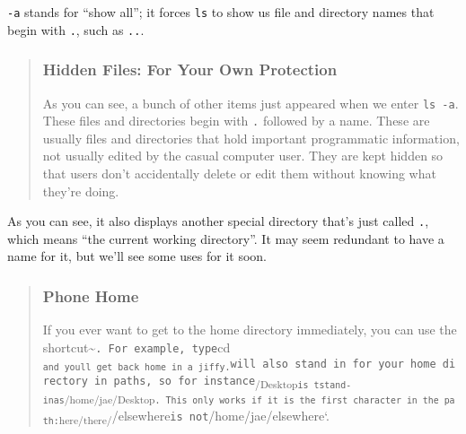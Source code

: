 \documentclass[
]{book}
\newenvironment{Shaded}{\begin{snugshade}}{\end{snugshade}}
\newcommand{\AttributeTok}[1]{\textcolor[rgb]{0.77,0.63,0.00}{#1}}
\newcommand{\BuiltInTok}[1]{#1}
\newcommand{\ExtensionTok}[1]{#1}
\newcommand{\NormalTok}[1]{#1}
\begin{document}
\begin{Shaded}
\end{Shaded}

\texttt{-a} stands for ``show all''; it forces \texttt{ls} to show us file and directory names that begin with \texttt{.}, such as \texttt{..}.

\begin{quote}
\hypertarget{hidden-files-for-your-own-protection}{%
\subsubsection{Hidden Files: For Your Own Protection}\label{hidden-files-for-your-own-protection}}

As you can see, a bunch of other items just appeared when we enter \texttt{ls\ -a}. These files and directories begin with \texttt{.} followed by a name. These are usually files and directories that hold important programmatic information, not usually edited by the casual computer user. They are kept hidden so that users don't accidentally delete or edit them without knowing what they're doing.
\end{quote}

As you can see, it also displays another special directory that's just called \texttt{.}, which means ``the current working directory''. It may seem redundant to have a name for it, but we'll see some uses for it soon.

\begin{quote}
\hypertarget{phone-home}{%
\subsubsection{Phone Home}\label{phone-home}}

If you ever want to get to the home directory immediately, you can use the shortcut\textasciitilde{}\texttt{.\ For\ example,\ type}cd \textsubscript{\texttt{and\ you\textquotesingle{}ll\ get\ back\ home\ in\ a\ jiffy.}}\texttt{will\ also\ stand\ in\ for\ your\ home\ directory\ in\ paths,\ so\ for\ instance}\textsubscript{/Desktop\texttt{is\ tstand-inas}/home/jae/Desktop\texttt{.\ This\ only\ works\ if\ it\ is\ the\ first\ character\ in\ the\ path:}here/there/}/elsewhere\texttt{is\ not}/home/jae/elsewhere`.
\end{quote}
\end{document}
